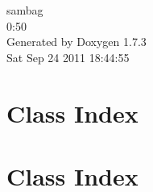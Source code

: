 \documentclass[a4paper]{book}
\begin{document}
\hypersetup{pageanchor=false}
\begin{titlepage}
\vspace*{7cm}
\begin{center}
{\Large sambag \\[1ex]\large 0:50 }\\
\vspace*{1cm}
{\large Generated by Doxygen 1.7.3}\\
\vspace*{0.5cm}
{\small Sat Sep 24 2011 18:44:55}\\
\end{center}
\end{titlepage}
\clearemptydoublepage
{}
\tableofcontents
\clearemptydoublepage
{}
\hypersetup{pageanchor=true}
\chapter{Class Index}

\chapter{Class Index}

\end{document}
